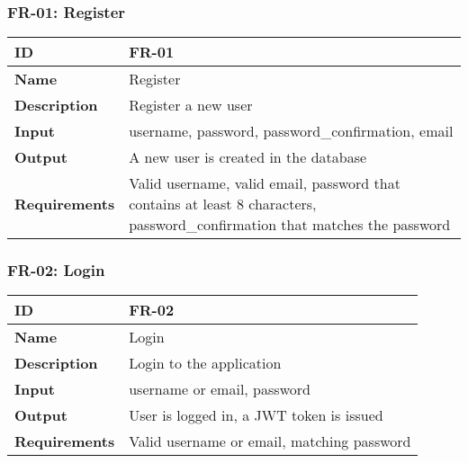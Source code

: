 
    \subsubsection{FR-01: Register}
    \begin{center}
        \begin{tabularx}{\textwidth}{|l|X|}
            \hline
            \textbf{ID} & FR-01 \\
            \hline
            \textbf{Name} & Register \\
            \hline
            \textbf{Description} & Register a new user \\
            \hline
            \textbf{Input} & username, password, password\_confirmation, email \\
            \hline
            \textbf{Output} & A new user is created in the database \\
            \hline
            \textbf{Requirements} & Valid username, valid email, password that contains at least 8 characters, password\_confirmation that matches the password \\
            \hline
        \end{tabularx}
    \end{center}
    
    

    \subsubsection{FR-02: Login}
    \begin{center}
        \begin{tabularx}{\textwidth}{|l|X|}
            \hline
            \textbf{ID} & FR-02 \\
            \hline
            \textbf{Name} & Login \\
            \hline
            \textbf{Description} & Login to the application \\
            \hline
            \textbf{Input} & username or email, password \\
            \hline
            \textbf{Output} & User is logged in, a JWT token is issued \\
            \hline
            \textbf{Requirements} & Valid username or email, matching password \\
            \hline
        \end{tabularx}
    \end{center}
    
    

